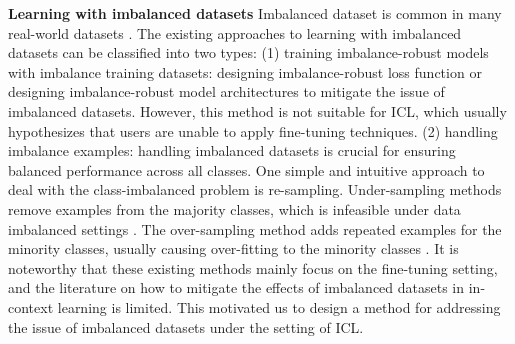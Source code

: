 \textbf{Learning with imbalanced datasets} Imbalanced dataset is common in many real-world datasets \citep{cui2018large,cui2019class,jamal2020rethinking, schultheis2024generalized}. 
The existing approaches to learning with imbalanced datasets can be classified into two types: (1) training imbalance-robust models with imbalance training datasets: designing imbalance-robust loss function \citep{jamal2020rethinking,tan2020equalization,park2023robust,bhat2023robust,garcin2022stochastic} or designing imbalance-robust model architectures \citep{long2022retrieval,pan2024lt} to mitigate the issue of imbalanced datasets. However, this method is not suitable for ICL, which usually hypothesizes that users are unable to apply fine-tuning techniques. (2) handling imbalance examples: handling imbalanced datasets is crucial for ensuring balanced performance across all classes. One simple and intuitive approach to deal with the class-imbalanced problem is re-sampling. Under-sampling methods remove examples from the majority classes, which is infeasible under data imbalanced settings \citep{liu2008exploratory,wei2022open}. The over-sampling method adds repeated examples for the minority classes, usually causing over-fitting to the minority classes \citep{chawla2002smote,shi2023re}. It is noteworthy that these existing methods mainly focus on the fine-tuning setting, and the literature on how to mitigate the effects of imbalanced datasets in in-context learning is limited. This motivated us to design a method for addressing the issue of imbalanced datasets under the setting of ICL.


%
